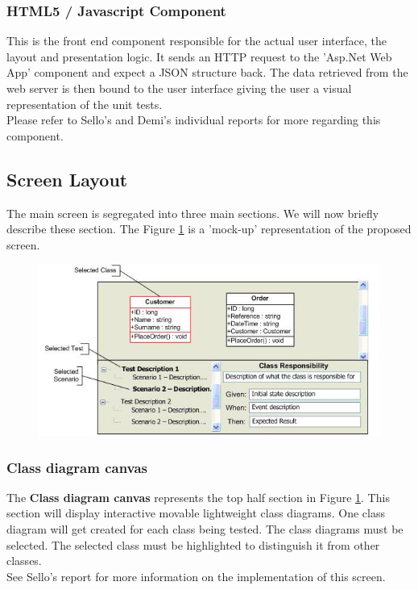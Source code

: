 \documentclass[a4paper,12pt]{Article}
\begin{document}
\subsubsection{HTML5 / Javascript Component}
This is the front end component responsible for the actual user interface, the layout and presentation logic. It sends an HTTP request to the 'Asp.Net Web App' component and expect a JSON\cite{json} structure back. The data retrieved from the web server is then bound to the user interface giving the user a visual representation of the unit tests.\\
\linebreak
Please refer to Sello's\cite{reportSello} and Demi's\cite{reportDemi} individual reports for more regarding this component.

\subsection{Screen Layout}
The main screen is segregated into three main sections. We will now briefly describe these section. The Figure \ref{fig2} is a 'mock-up' representation of the proposed screen. 


\begin{center}
	\begin{figure}
		\includegraphics{screenmock.JPG}
			\caption{}
			\label{fig2}    
	\end{figure}	
\end{center}


\subsubsection{Class diagram canvas}
The \textbf{Class diagram canvas} represents the top half section in Figure \ref{fig2}. This section will display interactive movable lightweight class diagrams. One class diagram will get created for each class being tested. The class diagrams must be selected. The selected class must be highlighted to distinguish it from other classes.\\
\linebreak 
See Sello’s\cite{reportSello} report for more information on the implementation of this screen.
\end{document}
